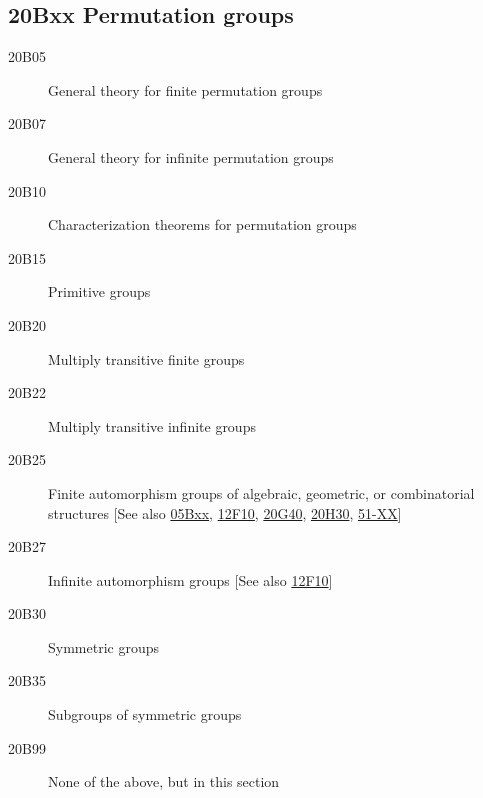 \subsection*{20Bxx  Permutation groups }\label{20Bxx}
\begin{description}  
\item [20B05]\label{20B05} General theory for finite permutation groups
\item [20B07]\label{20B07} General theory for infinite permutation groups
\item [20B10]\label{20B10} Characterization theorems for permutation groups
\item [20B15]\label{20B15} Primitive groups
\item [20B20]\label{20B20} Multiply transitive finite groups
\item [20B22]\label{20B22} Multiply transitive infinite groups
\item [20B25]\label{20B25} Finite automorphism groups of algebraic, geometric, or combinatorial structures [See also \hyperref[05Bxx]{05Bxx}, \hyperref[12F10]{12F10}, \hyperref[20G40]{20G40}, \hyperref[20H30]{20H30}, \hyperref[51-XX]{51-XX}]
\item [20B27]\label{20B27} Infinite automorphism groups [See also \hyperref[12F10]{12F10}]
\item [20B30]\label{20B30} Symmetric groups
\item [20B35]\label{20B35} Subgroups of symmetric groups
\item [20B99]\label{20B99} None of the above, but in this section
\end{description}
